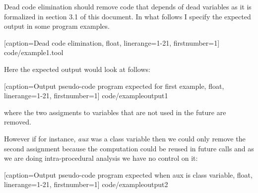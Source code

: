 Dead code elimination should remove code that depends of dead variables as it is formalized in section 3.1 of this document. In what follows I specify the expected output in some program examples.


  [caption=Dead code elimination, float, linerange={1-21}, firstnumber=1]
  {code/example1.tool}


Here the expected output would look at follows:


  [caption=Output pseudo-code program expected for first example, float, linerange={1-21}, firstnumber=1]
  {code/exampleoutput1}

where the two assigments to variables that are not used in the future are removed.

However if for instance, \emph{aux} was a class variable then we could only remove the second assignment because the computation could be reused in future calls and as we are doing intra-procedural analysis we have no control on it:



  [caption=Output pseudo-code program expected when aux is class variable, float, linerange={1-21}, firstnumber=1]
  {code/exampleoutput2}